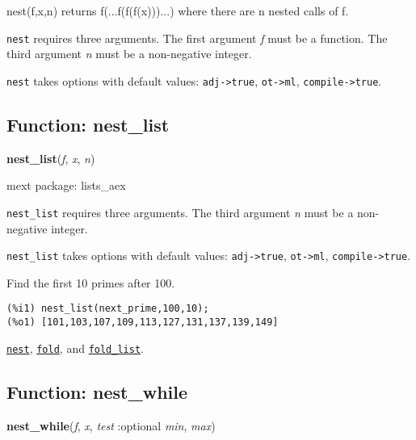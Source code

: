 \documentclass[]{article}
\begin{document}
\vspace{5 pt}
nest(f,x,n) returns f(...f(f(f(x)))...) where there are n nested calls of f. 

\vspace{5 pt}

   {\tt nest} requires three arguments.
    The first argument {\it f} must be a function.
    The third argument {\it n} must be a non-negative integer.


\vspace{5 pt}

{\tt nest} takes options with default values: {\tt adj->true}, {\tt ot->ml}, {\tt compile->true}.
\vspace{5 pt}


\subsection{Function: nest\_list\label{sec:nest_list}}
\hypertarget{nest_list}{}
{\bf nest\_list}({\it f}, {\it x}, {\it n})


\noindent mext package: lists\_aex



\vspace{5 pt}
   {\tt nest\_list} requires three arguments.
    The third argument {\it n} must be a non-negative integer.


\vspace{5 pt}

{\tt nest\_list} takes options with default values: {\tt adj->true}, {\tt ot->ml}, {\tt compile->true}.
\vspace{5 pt}


   Find the first 10 primes after 100. 

\begin{Verbatim}[frame=single]
(%i1) nest_list(next_prime,100,10);
(%o1) [101,103,107,109,113,127,131,137,139,149]
\end{Verbatim}


  \hyperlink{nest}{{\tt nest}}, \hyperlink{fold}{{\tt fold}}, and \hyperlink{fold_list}{{\tt fold\_list}}.

\vspace{5 pt}


\subsection{Function: nest\_while\label{sec:nest_while}}
\hypertarget{nest_while}{}
{\bf nest\_while}({\it f}, {\it x}, {\it test} :optional {\it min}, {\it max})
\end{document}
